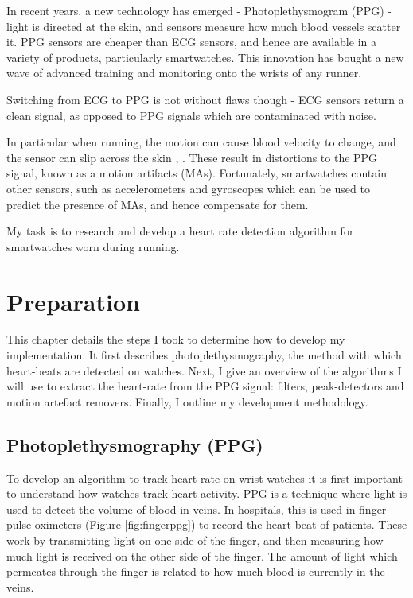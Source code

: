 \documentclass[12pt,a4paper,twoside,openright]{report}
\begin{document}
In recent years, a new technology has emerged - Photoplethysmogram (PPG) 
- light is directed at the skin, and sensors measure how much blood vessels
scatter it. PPG sensors are cheaper than ECG sensors, and hence are 
available in a variety of products, particularly smartwatches. This 
innovation has bought a new wave of advanced training and monitoring onto
the wrists of any runner.

Switching from ECG to PPG is not without flaws though - ECG sensors return a
clean signal, as opposed to PPG signals which are contaminated with
noise.

In particular when running, the motion can cause blood velocity to 
change, and the sensor can slip across the skin \cite{Wijshoff17}, 
\cite{Wood06}. These result in distortions to the PPG signal, known as a
motion artifacts (MAs). Fortunately, smartwatches contain other sensors, such
as accelerometers and gyroscopes which can be used to predict the presence of 
MAs, and hence compensate for them.

My task is to research and develop a heart rate detection algorithm
for smartwatches worn during running. 

\chapter{Preparation}

This chapter details the steps I took to determine how to develop my
implementation. It first describes photoplethysmography, the method with which heart-beats are
detected on watches. Next,
I give an overview of the algorithms I will use to extract the heart-rate from
the PPG signal: filters, peak-detectors and motion artefact removers. Finally, I
outline my development methodology.

\section{Photoplethysmography (PPG)}

To develop an algorithm to track heart-rate on wrist-watches it is first important to
understand how watches track heart activity. PPG is a technique where light is
used to detect the volume of blood in veins. In hospitals, this is used in
finger pulse oximeters (Figure \ref{fig:fingerppg}) to record the heart-beat
of patients. These work by transmitting light on one side of the finger, and
then measuring how much light is received on the other side of the finger.
The amount of light which permeates through the finger is related to how much
blood is currently in the veins.
\end{document}
